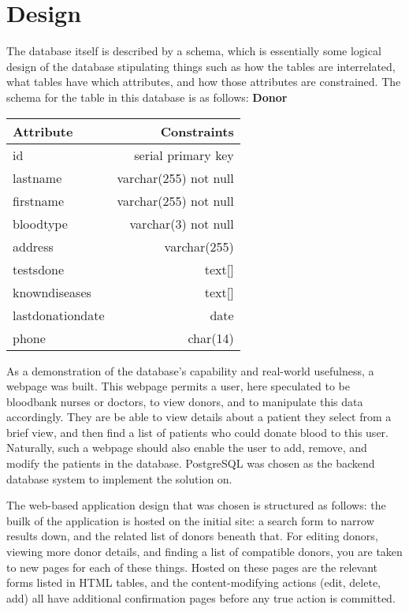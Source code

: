 \documentclass[runningheads,a4paper]{llncs}
\begin{document}
\section{Design}\label{sec:design}
The database itself is described by a schema, which is essentially
some logical design of the database stipulating things such as how the
tables are interrelated, what tables have which attributes, and how
those attributes are constrained. The schema for the table in this
database is as follows:
\newline
\textbf{Donor}
\newline
\begin{tabular}{| l | r |}
  \hline
  Attribute & Constraints \\
  \hline
  id & serial primary key \\
  lastname & varchar(255) not null \\
  firstname & varchar(255) not null \\
  bloodtype & varchar(3) not null \\
  address & varchar(255) \\
  testsdone & text[] \\
  knowndiseases & text[] \\
  lastdonationdate & date \\
  phone & char(14) \\
  \hline
\end{tabular}

As a demonstration of the database's capability and real-world
usefulness, a webpage was built. This webpage permits a user, here
speculated to be bloodbank nurses or doctors, to view donors, and to
manipulate this data accordingly. They are be able to view details
about a patient they select from a brief view, and then find a list of
patients who could donate blood to this user. Naturally, such a
webpage should also enable the user to add, remove, and modify the
patients in the database. PostgreSQL was chosen as the backend
database system to implement the solution on.

The web-based application design that was chosen is structured as
follows: the builk of the application is hosted on the initial site: a
search form to narrow results down, and the related list of donors
beneath that. For editing donors, viewing more donor details, and
finding a list of compatible donors, you are taken to new pages for
each of these things. Hosted on these pages are the relevant forms
listed in HTML tables, and the content-modifying actions (edit,
delete, add) all have additional confirmation pages before any true
action is committed.
\end{document}
